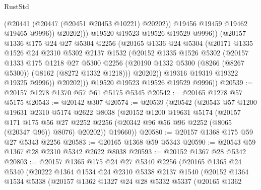 \begin{lexlean}{RustStd}
\begin{coremodule}
                          (@20441 (@20447 (@20451 @20453 @10221) @20202))
                          @19456
                          @19459
                          @19462
                          @19465
                          @9996))
                      @20202)))
                @19520
                @19523
                @19526
                @19529
                @9996))
            (@20157
              @1336
              @175
              @24
              @27
              @5304
              @2256
              (@20165
                @1336
                @24
                @5304
                (@20171
                  @1335
                  @1526
                  @24
                  @2310
                  @5302
                  @2137
                  @1532
                  (@20152
                    @1335
                    @1526
                    @5302
                    (@20157
                      @1333
                      @175
                      @1218
                      @27
                      @5300
                      @2256
                      (@20190 @1332 @5300 (@8266 (@8267 @5300)) (@8162 (@8272 @1332 @1218)))
                      @20202))
                  @19316
                  @19319
                  @19322
                  @19325
                  @9996))
              @20202)))
        @19520
        @19523
        @19526
        @19529
        @9996))
@20539 := @20157 @1278 @1370 @57 @61 @5175 @5345
@20542 := @20165 @1278 @57 @5175
@20543 := @20142 @307
@20574 := @20539
    (@20542
      (@20543
        @57
        @1200
        @19631
        @2310
        @5174
        @2622
        @8038
        (@20152
          @1200
          @19631
          @5174
          (@20157
            @171
            @175
            @56
            @27
            @2252
            @2256
            (@20342 @96 @56 @96 @2252 (@8065 (@20347 @96)) @8076)
            @20202))
        @19660))
@20580 := @20157 @1368 @175 @59 @27 @5343 @2256
@20583 := @20165 @1368 @59 @5343
@20590 := @20543 @59 @1367 @28 @2310 @5342 @2622 @8038
@20593 := @20152 @1367 @28 @5342
@20803 := @20157
    @1365
    @175
    @24
    @27
    @5340
    @2256
    (@20165
      @1365
      @24
      @5340
      (@20222
        @1364
        @1534
        @24
        @2310
        @5338
        @2137
        @1540
        (@20152
          @1364
          @1534
          @5338
          (@20157
            @1362
            @1327
            @24
            @28
            @5332
            @5337
            (@20165
              @1362

\end{coremodule}
\end{lexlean}

